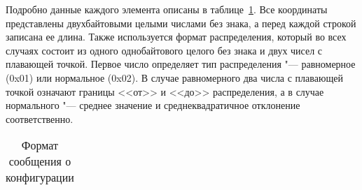 Подробно данные каждого элемента описаны в таблице~\ref{sec:development:preprocessor:format_table}.
Все координаты представлены двухбайтовыми целыми числами без знака, а перед каждой строкой записана ее длина.
Также используется формат распределения, который во всех случаях состоит из одного однобайтового целого без знака и двух чисел с плавающей точкой.
Первое число определяет тип распределения "--- равномерное (0x01) или нормальное (0x02).
В случае равномерного два числа с плавающей точкой означают границы <<от>> и <<до>> распределения,
а в случае нормального "--- среднее значение и среднеквадратичное отклонение соответственно.

\begin{longtable}[ht]{| >{\centering}m{}
                      | >{\centering}m{}
                      | >{\centering\arraybackslash}m{}|}
\caption{Формат сообщения о конфигурации} \label{sec:development:preprocessor:format_table}\tabularnewline


\end{longtable}
